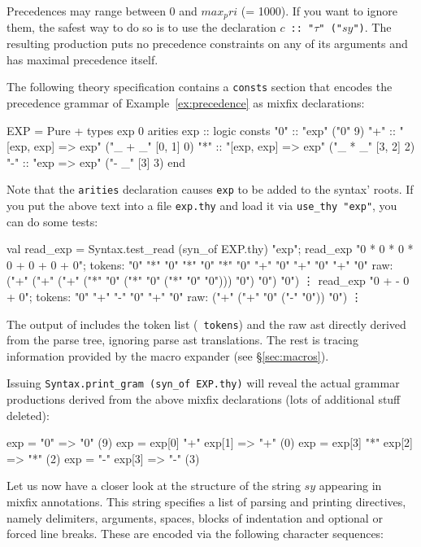 Precedences may range between $0$ and
$max_pri$ (= 1000). If you want to ignore them,
the safest way to do so is to use the declaration {\tt $c$ ::\ "$\tau$"
("$sy$")}. The resulting production puts no precedence constraints on any of
its arguments and has maximal precedence itself.

\begin{example}
The following theory specification contains a {\tt consts} section that
encodes the precedence grammar of Example~\ref{ex:precedence} as mixfix
declarations:
\begin{ttbox}
EXP = Pure +
types
  exp 0
arities
  exp :: logic
consts
  "0" :: "exp"                ("0" 9)
  "+" :: "[exp, exp] => exp"  ("_ + _" [0, 1] 0)
  "*" :: "[exp, exp] => exp"  ("_ * _" [3, 2] 2)
  "-" :: "exp => exp"         ("- _" [3] 3)
end
\end{ttbox}
Note that the {\tt arities} declaration causes {\tt exp} to be added to the
syntax' roots. If you put the above text into a file {\tt exp.thy} and load
it via {\tt use_thy "exp"}, you can do some tests:
\begin{ttbox}
val read_exp = Syntax.test_read (syn_of EXP.thy) "exp";
read_exp "0 * 0 * 0 * 0 + 0 + 0 + 0";
{\out tokens: "0" "*" "0" "*" "0" "*" "0" "+" "0" "+" "0" "+" "0"}
{\out raw: ("+" ("+" ("+" ("*" "0" ("*" "0" ("*" "0" "0"))) "0") "0") "0")}
{\out \vdots}
read_exp "0 + - 0 + 0";
{\out tokens: "0" "+" "-" "0" "+" "0"}
{\out raw: ("+" ("+" "0" ("-" "0")) "0")}
{\out \vdots}
\end{ttbox}
The output of  includes the token list ({\tt
tokens}) and the raw ast directly derived from the parse tree, ignoring parse
ast translations. The rest is tracing information provided by the macro
expander (see \S\ref{sec:macros}).

Issuing {\tt Syntax.print_gram (syn_of EXP.thy)} will reveal the actual
grammar productions derived from the above mixfix declarations (lots of
additional stuff deleted):
\begin{ttbox}
exp = "0"  => "0" (9)
exp = exp[0] "+" exp[1]  => "+" (0)
exp = exp[3] "*" exp[2]  => "*" (2)
exp = "-" exp[3]  => "-" (3)
\end{ttbox}
\end{example}

Let us now have a closer look at the structure of the string $sy$ appearing
in mixfix annotations. This string specifies a list of parsing and printing
directives, namely delimiters,
arguments, spaces,
blocks of indentation and optional or forced
line breaks. These are encoded via the
following character sequences:

